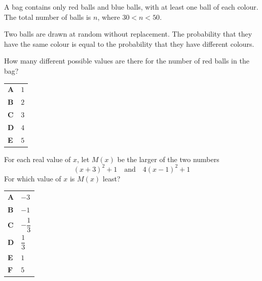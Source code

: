 \documentclass[11pt,a4paper]{article}
\begin{document}
\begin{enumerate}[label=\textbf{\arabic*.},leftmargin=*,itemsep=0pt,start=13]
A bag contains only red balls and blue balls, with at least one ball of each colour. The total number of balls is $n$, where $30<n<50$.

Two balls are drawn at random without replacement. 
The probability that they have the same colour is equal to the probability that they have different colours.

How many different possible values are there for the number of red balls in the bag?

\par\vspace*{12pt}
\begin{tabularx}{\linewidth}{@{}>{\bfseries}l Y@{}}
A &
$1$
\\[0.8em]
B &
$2$
\\[0.8em]
C &
$3$
\\[0.8em]
D &
$4$
\\[0.8em]
E &
$5$
\\
\end{tabularx}
\end{enumerate}
\clearpage
\thispagestyle{djspaper}
\vspace*{8pt}
\begin{enumerate}[label=\textbf{\arabic*.},leftmargin=*,itemsep=0pt,start=14]
For each real value of $x$, let $M(x)$ be the larger of the two numbers
\[
(x+3)^2+1 \quad \text{and} \quad 4(x-1)^2+1
\]
For which value of $x$ is $M(x)$ least?

\par\vspace*{12pt}
\begin{tabularx}{\linewidth}{@{}>{\bfseries}l Y@{}}
A &
$-3$
\\[0.8em]
B &
$-1$
\\[0.8em]
C &
$-\dfrac{1}{3}$
\\[0.8em]
D &
$\dfrac{1}{3}$
\\[0.8em]
E &
$1$
\\[0.8em]
F &
$5$
\\
\end{tabularx}
\end{enumerate}
\end{document}
